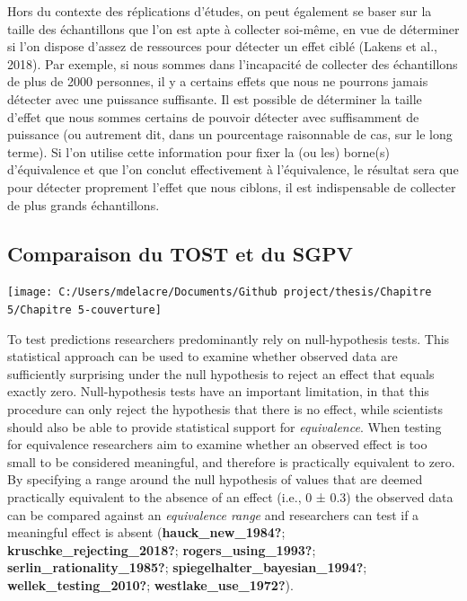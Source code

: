 \documentclass[
  english,
  man]{apa6}
\begin{document}
Hors du contexte des réplications d'études, on peut également se baser sur la taille des échantillons que l'on est apte à collecter soi-même, en vue de déterminer si l'on dispose d'assez de ressources pour détecter un effet ciblé (Lakens et al., 2018). Par exemple, si nous sommes dans l'incapacité de collecter des échantillons de plus de 2000 personnes, il y a certains effets que nous ne pourrons jamais détecter avec une puissance suffisante. Il est possible de déterminer la taille d'effet que nous sommes certains de pouvoir détecter avec suffisamment de puissance (ou autrement dit, dans un pourcentage raisonnable de cas, sur le long terme). Si l'on utilise cette information pour fixer la (ou les) borne(s) d'équivalence et que l'on conclut effectivement à l'équivalence, le résultat sera que pour détecter proprement l'effet que nous ciblons, il est indispensable de collecter de plus grands échantillons.

\hypertarget{comparaison-du-tost-et-du-sgpv}{%
\subsection{Comparaison du TOST et du SGPV}\label{comparaison-du-tost-et-du-sgpv}}

\begin{center}\texttt{[image: C:/Users/mdelacre/Documents/Github project/thesis/Chapitre 5/Chapitre 5-couverture]} \end{center}
\newpage

To test predictions researchers predominantly rely on null-hypothesis tests.
This statistical approach can be used to examine whether observed data are sufficiently surprising under the null hypothesis to reject an effect that equals exactly zero.
Null-hypothesis tests have an important limitation, in that this procedure can only reject the hypothesis that there is no effect, while scientists should also be able to provide statistical support for \emph{equivalence}.
When testing for equivalence researchers aim to examine whether an observed effect is too small to be considered meaningful, and therefore is practically equivalent to zero.
By specifying a range around the null hypothesis of values that are deemed practically equivalent to the absence of an effect (i.e., 0 ± 0.3) the observed data can be compared against an \emph{equivalence range} and researchers can test if a meaningful effect is absent (\textbf{hauck\_new\_1984?}; \textbf{kruschke\_rejecting\_2018?}; \textbf{rogers\_using\_1993?}; \textbf{serlin\_rationality\_1985?}; \textbf{spiegelhalter\_bayesian\_1994?}; \textbf{wellek\_testing\_2010?}; \textbf{westlake\_use\_1972?}).
\end{document}
